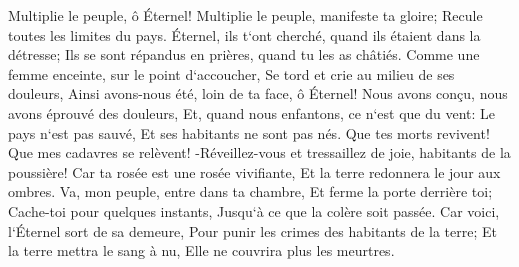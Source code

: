 \verse Multiplie le peuple, ô Éternel! Multiplie le peuple, manifeste ta gloire; Recule toutes les limites du pays. 
\verse Éternel, ils t`ont cherché, quand ils étaient dans la détresse; Ils se sont répandus en prières, quand tu les as châtiés. 
\verse Comme une femme enceinte, sur le point d`accoucher, Se tord et crie au milieu de ses douleurs, Ainsi avons-nous été, loin de ta face, ô Éternel! 
\verse Nous avons conçu, nous avons éprouvé des douleurs, Et, quand nous enfantons, ce n`est que du vent: Le pays n`est pas sauvé, Et ses habitants ne sont pas nés. 
\verse Que tes morts revivent! Que mes cadavres se relèvent! -Réveillez-vous et tressaillez de joie, habitants de la poussière! Car ta rosée est une rosée vivifiante, Et la terre redonnera le jour aux ombres. 
\verse Va, mon peuple, entre dans ta chambre, Et ferme la porte derrière toi; Cache-toi pour quelques instants, Jusqu`à ce que la colère soit passée. 
\verse Car voici, l`Éternel sort de sa demeure, Pour punir les crimes des habitants de la terre; Et la terre mettra le sang à nu, Elle ne couvrira plus les meurtres. 

